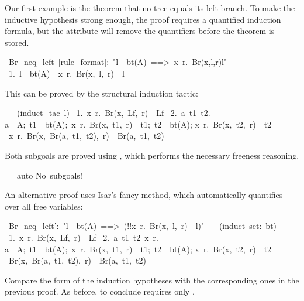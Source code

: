 Our first example is the theorem that no tree equals its
left branch.  To make the inductive hypothesis strong enough, 
the proof requires a quantified induction formula, but 
the  attribute will remove the quantifiers 
before the theorem is stored.
\begin{isabelle}
\ Br\_neq\_left\ [rule\_format]:\ "l\ \isasymin \
bt(A)\ ==>\ \isasymforall x\ r.\ Br(x,l,r)\isasymnoteq{}l"\isanewline
\ 1.\ l\ \isasymin \ bt(A)\ \isasymLongrightarrow \ \isasymforall x\ r.\ Br(x,\ l,\ r)\ \isasymnoteq \ l%
\end{isabelle}
This can be proved by the structural induction tactic:
\begin{isabelle}
\ \ \ (induct\_tac\ l)\isanewline
\ 1.\ \isasymforall x\ r.\ Br(x,\ Lf,\ r)\ \isasymnoteq \ Lf\isanewline
\ 2.\ \isasymAnd a\ t1\ t2.\isanewline
{}\isasymlbrakk a\ \isasymin \ A;\ t1\ \isasymin \ bt(A);\ \isasymforall x\ r.\ Br(x,\ t1,\ r)\ \isasymnoteq \ t1;\ t2\ \isasymin \ bt(A);\isanewline
\isaindent{\ 2.\ \ \ \ \ \ \ }\isasymforall x\ r.\ Br(x,\ t2,\ r)\ \isasymnoteq \ t2\isasymrbrakk \isanewline
\isaindent{\ 2.\ \ \ \ }\isasymLongrightarrow \ \isasymforall x\ r.\ Br(x,\ Br(a,\ t1,\ t2),\ r)\ \isasymnoteq \ Br(a,\ t1,\ t2)
\end{isabelle}
Both subgoals are proved using , which performs the necessary
freeness reasoning. 
\begin{isabelle}
\ \ \ auto\isanewline
No\ subgoals!\isanewline
{}
\end{isabelle}

An alternative proof uses Isar's fancy  method, which 
automatically quantifies over all free variables:

\begin{isabelle}
\ Br\_neq\_left':\ "l\ \isasymin \ bt(A)\ ==>\ (!!x\ r.\ Br(x,\ l,\ r)\ \isasymnoteq \ l)"\isanewline
\ \ \isacommand{apply}\ (induct\ set:\ bt)\isanewline
\ 1.\ \isasymAnd x\ r.\ Br(x,\ Lf,\ r)\ \isasymnoteq \ Lf\isanewline
\ 2.\ \isasymAnd a\ t1\ t2\ x\ r.\isanewline
{}\isasymlbrakk a\ \isasymin \ A;\ t1\ \isasymin \ bt(A);\ \isasymAnd x\ r.\ Br(x,\ t1,\ r)\ \isasymnoteq \ t1;\ t2\ \isasymin \ bt(A);\isanewline
\isaindent{\ 2.\ \ \ \ \ \ \ }\isasymAnd x\ r.\ Br(x,\ t2,\ r)\ \isasymnoteq \ t2\isasymrbrakk \isanewline
\isaindent{\ 2.\ \ \ \ }\isasymLongrightarrow \ Br(x,\ Br(a,\ t1,\ t2),\ r)\ \isasymnoteq \ Br(a,\ t1,\ t2)
\end{isabelle}
Compare the form of the induction hypotheses with the corresponding ones in
the previous proof. As before, to conclude requires only \isa{auto}.

